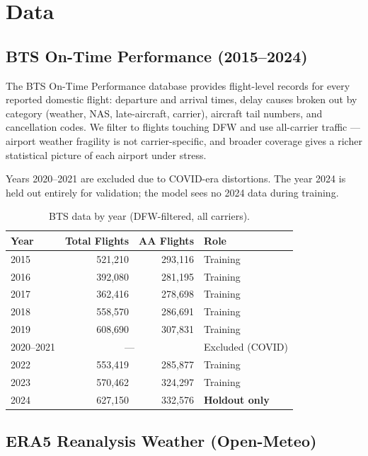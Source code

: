 \documentclass[11pt, twoside]{article}
\begin{document}
\section{Data}
\label{sec:data}

\subsection{BTS On-Time Performance (2015--2024)}

The BTS On-Time Performance database provides flight-level records for every
reported domestic flight: departure and arrival times, delay causes broken out
by category (weather, NAS, late-aircraft, carrier), aircraft tail numbers, and
cancellation codes.  We filter to flights touching DFW and use all-carrier
traffic --- airport weather fragility is not carrier-specific, and broader
coverage gives a richer statistical picture of each airport under stress.

Years 2020--2021 are excluded due to COVID-era distortions.  The year 2024 is
held out entirely for validation; the model sees no 2024 data during training.

\begin{table}[H]
\centering
\caption{BTS data by year (DFW-filtered, all carriers).}
\label{tab:bts_years}
\begin{tabular}{lrrl}
\toprule
Year & Total Flights & AA Flights & Role \\
\midrule
2015 & 521,210 & 293,116 & Training \\
2016 & 392,080 & 281,195 & Training \\
2017 & 362,416 & 278,698 & Training \\
2018 & 558,570 & 286,691 & Training \\
2019 & 608,690 & 307,831 & Training \\
2020--2021 & \multicolumn{2}{c}{---} & Excluded (COVID) \\
2022 & 553,419 & 285,877 & Training \\
2023 & 570,462 & 324,297 & Training \\
2024 & 627,150 & 332,576 & \textbf{Holdout only} \\
\bottomrule
\end{tabular}
\end{table}

\subsection{ERA5 Reanalysis Weather (Open-Meteo)}
\end{document}
